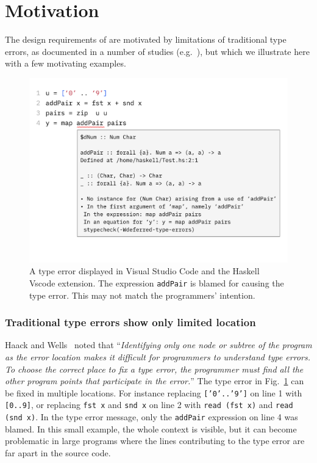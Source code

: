 
\section{Motivation}
The design requirements of \chameleon{} are motivated by limitations of traditional type errors, as documented in a number of studies (e.g.~\cite{yang_improved_2000, hage_solved_2020}), but which we illustrate here with a few motivating examples. 

\begin{figure}
    \centering
    \includegraphics[width=\linewidth,trim=0mm 35mm 0mm 0mm]{images/add-pair-example.pdf}
    \caption{
    A type error displayed in Visual Studio Code\cite{microsoft_visual_nodate} and the Haskell Vscode extension\cite{haskell_haskell_nodate}.
The expression \texttt{addPair} is blamed for causing the type error. This may not match the programmers' intention. 
    }
    \label{fig:motivation-example}
\end{figure}
\subsubsection{\textbf{Traditional type errors show only limited location}}
Haack and Wells~\cite{haack_type_2004} noted that ``\textit{Identifying only one node or subtree of the program as the error location makes it difficult for programmers to understand type errors. To choose the correct place to fix a type error, the programmer must find all the other program points that participate in the error.}'' The type error in Fig.~\ref{fig:motivation-example} can be fixed in multiple locations. For instance  replacing \texttt{['0'..'9']} on line 1 with \texttt{[0..9]}, or replacing \texttt{fst x} and \texttt{snd x} on line 2 with \texttt {read (fst x)} and \texttt{read (snd  x)}. In the type error message, only the \texttt{addPair} expression on line 4 was blamed.  In this small example, the whole context is visible, but it can become problematic in large programs where the lines contributing to the type error are far apart in the source code.

